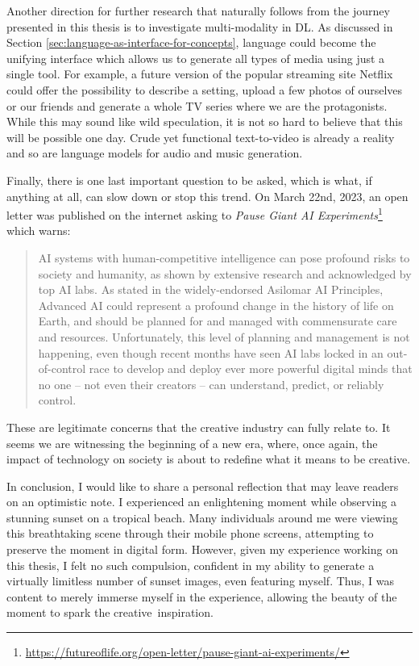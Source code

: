 Another direction for further research that naturally follows from the journey presented in this thesis is to investigate multi-modality in DL. As discussed in Section \ref{sec:language-as-interface-for-concepts}, language could become the unifying interface which allows us to generate all types of media using just a single tool. For example, a future version of the popular streaming site Netflix could offer the possibility to describe a setting, upload a few photos of ourselves or our friends and generate a whole TV series where we are the protagonists. While this may sound like wild speculation, it is not so hard to believe that this will be possible one day. Crude yet functional text-to-video is already a reality \citep{Esser2023} and so are language models for audio \citep{Borsos2022} and music \citep{Agostinelli2023} generation. 

Finally, there is one last important question to be asked, which is what, if anything at all, can slow down or stop this trend. On March 22nd, 2023, an open letter was published on the internet asking to \emph{Pause Giant AI Experiments}\footnote{\url{https://futureoflife.org/open-letter/pause-giant-ai-experiments/}} which warns: \blockquote{AI systems with human-competitive intelligence can pose profound risks to society and humanity, as shown by extensive research and acknowledged by top AI labs. As stated in the widely-endorsed Asilomar AI Principles, Advanced AI could represent a profound change in the history of life on Earth, and should be planned for and managed with commensurate care and resources. Unfortunately, this level of planning and management is not happening, even though recent months have seen AI labs locked in an out-of-control race to develop and deploy ever more powerful digital minds that no one – not even their creators – can understand, predict, or reliably control.} These are legitimate concerns that the creative industry can fully relate to. It seems we are witnessing the beginning of a new era, where, once again, the impact of technology on society is about to redefine what it means to be creative.

In conclusion, I would like to share a personal reflection that may leave readers on an optimistic note. I experienced an enlightening moment while observing a stunning sunset on a tropical beach. Many individuals around me were viewing this breathtaking scene through their mobile phone screens, attempting to preserve the moment in digital form. However, given my experience working on this thesis, I felt no such compulsion, confident in my ability to generate a virtually limitless number of sunset images, even featuring myself. Thus, I was content to merely immerse myself in the experience, allowing the beauty of the moment to spark the creative inspiration.

